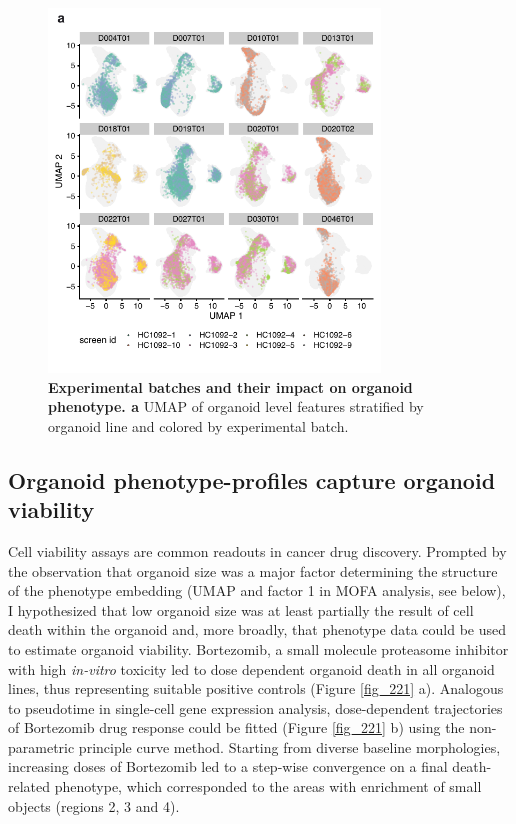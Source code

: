 \begin{flushleft}
\begin{figure}[!h]
\centering
\includegraphics[width=250pt,
                height=\textheight,
                keepaspectratio]{figures/promise/pdf/fig_1_6.pdf}
\caption[Experimental batches and their impact on organoid phenotype]{\textbf{Experimental batches and their impact on organoid phenotype. a} UMAP of organoid level features stratified by organoid line and colored by experimental batch.}
\label{fig_216}
\end{figure}


\subsection{Organoid phenotype-profiles capture organoid viability}

Cell viability assays are common readouts in cancer drug discovery. Prompted by the observation that organoid size was a major factor determining the structure of the phenotype embedding (UMAP and factor 1 in MOFA analysis, see below), I hypothesized that low organoid size was at least partially the result of cell death within the organoid and, more broadly, that phenotype data could be used to estimate organoid viability. Bortezomib, a small molecule proteasome inhibitor with high \textit{in-vitro} toxicity led to dose dependent organoid death in all organoid lines, thus representing suitable positive controls (Figure \ref{fig_221} a). Analogous to pseudotime in single-cell  gene expression analysis, dose-dependent trajectories of Bortezomib drug response could be fitted (Figure \ref{fig_221} b) using the non-parametric principle curve method. Starting from diverse baseline morphologies, increasing doses of Bortezomib led to a step-wise convergence on a final death-related phenotype, which corresponded to the areas with enrichment of small objects (regions 2, 3 and 4). 


\end{flushleft}
